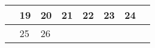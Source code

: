 {\begin{tabularx}{\linewidth}{|l!{\vrule width \myLenLineThicknessThick}*{7}{@{}X@{}|}}
       & 
    
      
      
        \begin{minipage}[t]{6mm}\centering{}19\end{minipage}
      
       & 
    
      
      
        \begin{minipage}[t]{6mm}\centering{}20\end{minipage}
      
       & 
    
      
      
        \begin{minipage}[t]{6mm}\centering{}21\end{minipage}
      
       & 
    
      
      
        \begin{minipage}[t]{6mm}\centering{}22\end{minipage}
      
       & 
    
      
      
        \begin{minipage}[t]{6mm}\centering{}23\end{minipage}
      
       & 
    
      
      
        \begin{minipage}[t]{6mm}\centering{}24\end{minipage}
      
      
        \\  \hline 
      
    
  
  
  
  \hyperlink{week-2025-34}{} &
    
      
      
        \begin{minipage}[t]{6mm}\centering{}25\end{minipage}
      
       & 
    
      
      
        \begin{minipage}[t]{6mm}\centering{}26\end{minipage}
      

\end{tabularx}}
